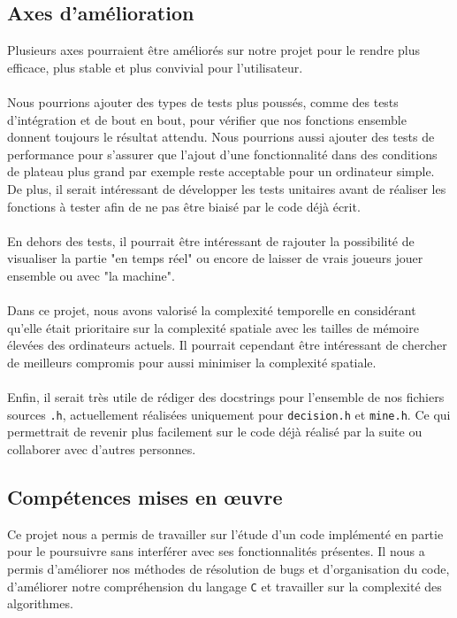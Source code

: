 \subsection*{Axes d'amélioration}
Plusieurs axes pourraient être améliorés sur notre projet pour le rendre plus efficace, plus stable et plus convivial pour l'utilisateur.\\ \\
Nous pourrions ajouter des types de tests plus poussés, comme des tests d'intégration et de bout en bout, pour vérifier que nos fonctions ensemble donnent toujours le résultat attendu.
Nous pourrions aussi ajouter des tests de performance pour s'assurer que l'ajout d'une fonctionnalité dans des conditions de plateau plus grand par exemple reste acceptable pour un ordinateur simple.\\
De plus, il serait intéressant de développer les tests unitaires avant de réaliser les fonctions à tester afin de ne pas être biaisé par le code déjà écrit.\\ \\
En dehors des tests, il pourrait être intéressant de rajouter la possibilité de visualiser la partie "en temps réel" ou encore de laisser de vrais joueurs jouer ensemble ou avec "la machine".\\ \\
Dans ce projet, nous avons valorisé la complexité temporelle en considérant qu'elle était prioritaire sur la complexité spatiale avec les tailles de mémoire élevées des ordinateurs actuels.
Il pourrait cependant être intéressant de chercher de meilleurs compromis pour aussi minimiser la complexité spatiale.\\ \\
Enfin, il serait très utile de rédiger des docstrings pour l'ensemble de nos fichiers sources \texttt{.h}, actuellement réalisées uniquement pour \texttt{decision.h} et \texttt{mine.h}. Ce qui permettrait de revenir plus facilement sur le code déjà réalisé par la suite ou collaborer avec d'autres personnes.

\subsection*{Compétences mises en œuvre} 
Ce projet nous a permis de travailler sur l'étude d'un code implémenté en partie pour le poursuivre sans interférer avec ses fonctionnalités présentes.
Il nous a permis d'améliorer nos méthodes de résolution de bugs et d'organisation du code, d'améliorer notre compréhension du langage \texttt{C} et travailler sur la complexité des algorithmes.
